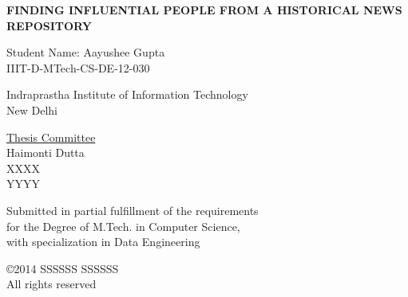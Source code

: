 

\def\addrone{Your address}
\def\addrtwo{Your city}

\def\degree{M.Tech. in Computer Science with Specialization in Data Engineering}


\def\submissiondate{June 01, 2014}

\def\supervisorone{Haimonti Dutta}

\def\supervisortwo{XXXX}

\def\supervisorthree{YYYY}





\thispagestyle{empty}

\begin{center}

{\LARGE \bf {FINDING INFLUENTIAL PEOPLE FROM A HISTORICAL NEWS REPOSITORY }

 }  
 \vspace{.3in}
 
 {\Large{Student Name: Aayushee Gupta}} \\  
 \vspace{.1in} 
 IIIT-D-MTech-CS-DE-12-030 \\

  
    \vspace{.35in}

  \vspace{.25in}

{Indraprastha Institute of Information Technology\\
New Delhi}

\vspace{.35in}  {\underline{Thesis Committee} \\ \supervisorone         
   \\ \supervisortwo \\ \supervisorthree }\\ \vspace{.35in}


 {Submitted in partial fulfillment of the requirements \\for the Degree of M.Tech. in Computer Science, \\ with specialization in Data Engineering}

\vspace{.2in}

\copyright 2014 SSSSSS SSSSSS \\ All rights reserved \\
\vspace{.8in}


\end{center}
